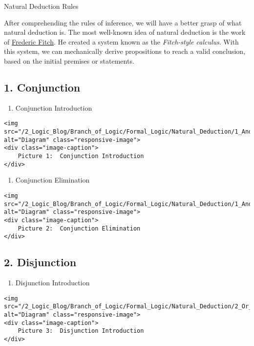 Natural Deduction Rules

After comprehending the rules of inference, we will have a better grasp
of what natural deduction is. The most well-known idea of natural
deduction is the work of
\href{https://en.wikipedia.org/wiki/Frederic_Fitch}{Frederic Fitch}. He
created a system known as the \emph{Fitch-style calculus}. With this
system, we can mechanically derive propositions to reach a valid
conclusion, based on the initial premises or statements.

\subsection{1. Conjunction}\label{conjunction}

\begin{enumerate}
\def\labelenumi{\alph{enumi}.}
\tightlist
\item
  Conjunction Introduction
\end{enumerate}

\begin{verbatim}
<img src="/2_Logic_Blog/Branch_of_Logic/Formal_Logic/Natural_Deduction/1_And_Intro.png" alt="Diagram" class="responsive-image">
<div class="image-caption">
    Picture 1:  Conjunction Introduction
</div>
\end{verbatim}

\begin{enumerate}
\def\labelenumi{\alph{enumi}.}
\setcounter{enumi}{1}
\tightlist
\item
  Conjunction Elimination
\end{enumerate}

\begin{verbatim}
<img src="/2_Logic_Blog/Branch_of_Logic/Formal_Logic/Natural_Deduction/1_And_Elim.png" alt="Diagram" class="responsive-image">
<div class="image-caption">
    Picture 2:  Conjunction Elimination
</div>
\end{verbatim}

\subsection{2. Disjunction}\label{disjunction}

\begin{enumerate}
\def\labelenumi{\alph{enumi}.}
\tightlist
\item
  Disjunction Introduction
\end{enumerate}

\begin{verbatim}
<img src="/2_Logic_Blog/Branch_of_Logic/Formal_Logic/Natural_Deduction/2_Or_Intro.png" alt="Diagram" class="responsive-image">
<div class="image-caption">
    Picture 3:  Disjunction Introduction
</div>
\end{verbatim}

